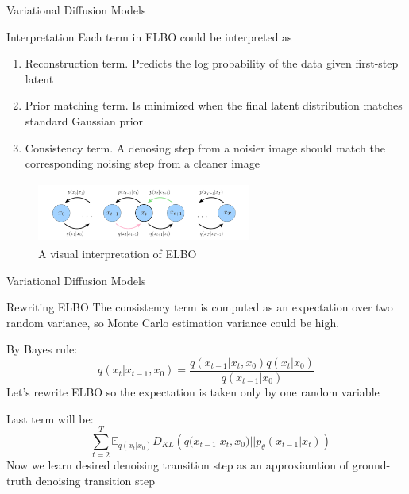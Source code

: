 \documentclass{beamer}
\begin{document}
\begin{frame}{Variational Diffusion Models}
    \begin{block}{Interpretation}
     Each term in ELBO could be interpreted as
    \begin{enumerate}
    \item Reconstruction term. Predicts the log probability of the data given first-step latent
    \item Prior matching term. Is minimized when the final latent distribution matches standard Gaussian prior
    \item Consistency term. A denosing step from a noisier image should match the corresponding noising step from a cleaner image
    \end{enumerate}
    \end{block}
    \begin{figure}[h]
        \centering
        \includegraphics[width=7cm, height=2cm]{diffusion_4.png}
    \caption{A visual interpretation of ELBO}
    \end{figure}
\end{frame}

\begin{frame}{Variational Diffusion Models}
    \begin{block}{Rewriting ELBO}
    The consistency term is computed as an expectation over two random variance, so Monte Carlo estimation variance could be high.
    
    By Bayes rule:
    \[q(x_t|x_{t-1}, x_0) = \dfrac{q(x_{t-1}|x_t, x_0)q(x_t|x_0)}{q(x_{t-1}|x_0)}\]
    Let's rewrite ELBO so the expectation is taken only by one random variable
    
    Last term will be:
    \[-\sum_{t=2}^T \mathbb{E}_{q(x_t|x_0)} D_{KL}\left(q(x_{t-1}|x_t, x_0) || p_{\theta}(x_{t-1}|x_t)\right)\]
    Now we learn desired denoising transition step as an approxiamtion of ground-truth denoising transition step
    \end{block}
\end{frame}
\end{document}
